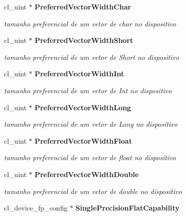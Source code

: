 \begin{DoxyCompactItemize}
\mbox{\label{structdevices_a0cf0b0ac0fe1535afc27d9fe2149d354}} 
cl\+\_\+uint $\ast$ \textbf{ Preferred\+Vector\+Width\+Char}
\begin{DoxyCompactList}\small\item\em tamanho preferencial de um vetor de char no dispositivo \end{DoxyCompactList}\item 
\mbox{\label{structdevices_a8487ae555d79b9b78bbfd7b76e2f90d1}} 
cl\+\_\+uint $\ast$ \textbf{ Preferred\+Vector\+Width\+Short}
\begin{DoxyCompactList}\small\item\em tamanho preferencial de um vetor de Short no dispositivo \end{DoxyCompactList}\item 
\mbox{\label{structdevices_a81160e33a03587e3694ae6ff69471643}} 
cl\+\_\+uint $\ast$ \textbf{ Preferred\+Vector\+Width\+Int}
\begin{DoxyCompactList}\small\item\em tamanho preferencial de um vetor de Int no dispositivo \end{DoxyCompactList}\item 
\mbox{\label{structdevices_a4dc38a84c0b638f142cb5ba2b886b032}} 
cl\+\_\+uint $\ast$ \textbf{ Preferred\+Vector\+Width\+Long}
\begin{DoxyCompactList}\small\item\em tamanho preferencial de um vetor de Long no dispositivo \end{DoxyCompactList}\item 
\mbox{\label{structdevices_a1b05f9cf6d0b49016bf48833ea3ff0e3}} 
cl\+\_\+uint $\ast$ \textbf{ Preferred\+Vector\+Width\+Float}
\begin{DoxyCompactList}\small\item\em tamanho preferencial de um vetor de float no dispositivo \end{DoxyCompactList}\item 
\mbox{\label{structdevices_a36376e35408549d958ffce74baec74f9}} 
cl\+\_\+uint $\ast$ \textbf{ Preferred\+Vector\+Width\+Double}
\begin{DoxyCompactList}\small\item\em tamanho preferencial de um vetor de double no dispositivo \end{DoxyCompactList}\item 
\mbox{\label{structdevices_af2485ecd861d278d13ea124342d95f36}} 
cl\+\_\+device\+\_\+fp\+\_\+config $\ast$ \textbf{ Single\+Precision\+Flat\+Capability}

\end{DoxyCompactItemize}
